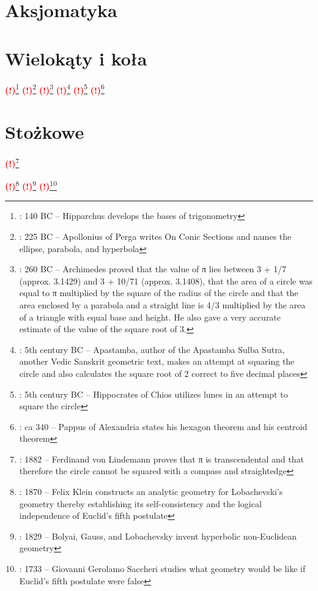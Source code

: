 \documentclass{greaseproof}
\newcommand{\todofoot}[1]{\textcolor{red}{\textbf{(!)}\footnote{\textbf{\color{red}{Do zrobienia}}: #1}}}
\begin{document}


\chapter{Aksjomatyka}




\chapter{Wielokąty i koła}


\todofoot{140 BC – Hipparchus develops the bases of trigonometry}
\todofoot{225 BC – Apollonius of Perga writes On Conic Sections and names the ellipse, parabola, and hyperbola}
\todofoot{260 BC – Archimedes proved that the value of π lies between 3 + 1/7 (approx. 3.1429) and 3 + 10/71 (approx. 3.1408), that the area of a circle was equal to π multiplied by the square of the radius of the circle and that the area enclosed by a parabola and a straight line is 4/3 multiplied by the area of a triangle with equal base and height. He also gave a very accurate estimate of the value of the square root of 3.}
\todofoot{5th century BC – Apastamba, author of the Apastamba Sulba Sutra, another Vedic Sanskrit geometric text, makes an attempt at squaring the circle and also calculates the square root of 2 correct to five decimal places}
\todofoot{5th century BC – Hippocrates of Chios utilizes lunes in an attempt to square the circle}
\todofoot{ca 340 – Pappus of Alexandria states his hexagon theorem and his centroid theorem}




\chapter{Stożkowe}



\todofoot{1882 – Ferdinand von Lindemann proves that π is transcendental and that therefore the circle cannot be squared with a compass and straightedge}


\todofoot{1870 – Felix Klein constructs an analytic geometry for Lobachevski's geometry thereby establishing its self-consistency and the logical independence of Euclid's fifth postulate}
\todofoot{1829 – Bolyai, Gauss, and Lobachevsky invent hyperbolic non-Euclidean geometry}
\todofoot{1733 – Giovanni Gerolamo Saccheri studies what geometry would be like if Euclid's fifth postulate were false}
\end{document}
